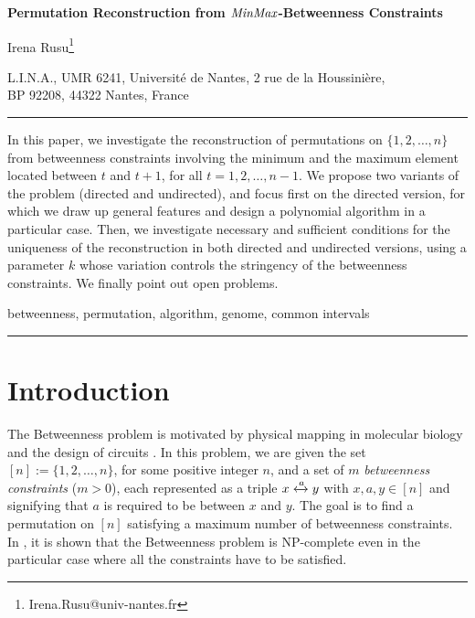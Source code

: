 \documentclass{article}
\newcommand{\M}{\mbox{\it MinMax}}
\newcommand{\n}{[n]}
\newcommand{\lrf}[1]{\xleftrightarrow{#1}}
\begin{document}
\begin{center}
{\bf\large Permutation Reconstruction from $\M$-Betweenness Constraints}\\




\vspace*{1cm}

Irena Rusu\footnote{Irena.Rusu@univ-nantes.fr}

L.I.N.A., UMR 6241, Universit\'e de Nantes, 2 rue de
la Houssini\` ere,\\

 BP 92208, 44322 Nantes, France
\end{center}



\vspace*{1cm}

\hrule
\vspace{0.3cm}



In this paper, we investigate the  reconstruction of permutations on $\{1, 2, \ldots, n\}$ from
betweenness constraints involving the minimum and the maximum element located between 
 $t$ and $t+1$, for all $t=1, 2, \ldots, n-1$.  We propose two
variants of the problem (directed and undirected), and focus first on the directed version,
for which we draw up general features and design a polynomial algorithm 
in a particular case. Then, we investigate
necessary and  sufficient conditions for the uniqueness of the reconstruction
in both directed and undirected versions, using a parameter $k$ whose variation controls the
stringency of the betweenness constraints. We finally point out open problems.
\medskip

 betweenness, permutation, algorithm, genome, common intervals
\vspace{0.2cm}

\hrule

\section{Introduction}

The {\sc Betweenness} problem is motivated by physical mapping in molecular biology and the design of circuits 
\cite{opatrny1979total}.
In this problem, we are given the set $\n :=\{1, 2, \ldots, n\}$, for some positive integer $n$,  
and a set of $m$ {\em betweenness constraints} ($m>0$), each represented as a triple $x\lrf{a}y$ with $x,a,y\in\n$ and signifying that $a$ is required to be between $x$ and $y$. The goal is to find a 
permutation on $\n$ satisfying a maximum number of betweenness constraints. In \cite{opatrny1979total},
it is shown that the {\sc Betweenness} problem is NP-complete even in the particular case where all the
constraints have to be satisfied.
\end{document}
